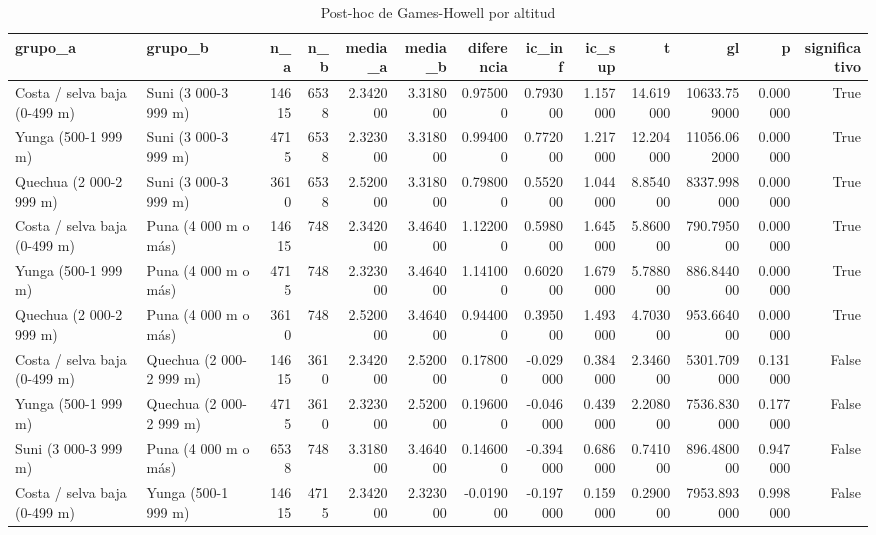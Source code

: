 \begin{table}[htbp]
\caption{Post-hoc de Games-Howell por altitud}
\label{tab:tabla_36_posthoc_altitud}
\begin{tabular}{llrrrrrrrrrrr}
\toprule
grupo\_a & grupo\_b & n\_a & n\_b & media\_a & media\_b & diferencia & ic\_inf & ic\_sup & t & gl & p & significativo \\
\midrule
Costa / selva baja (0-499 m) & Suni (3 000-3 999 m) & 14615 & 6538 & 2.342000 & 3.318000 & 0.975000 & 0.793000 & 1.157000 & 14.619000 & 10633.759000 & 0.000000 & True \\
Yunga (500-1 999 m) & Suni (3 000-3 999 m) & 4715 & 6538 & 2.323000 & 3.318000 & 0.994000 & 0.772000 & 1.217000 & 12.204000 & 11056.062000 & 0.000000 & True \\
Quechua (2 000-2 999 m) & Suni (3 000-3 999 m) & 3610 & 6538 & 2.520000 & 3.318000 & 0.798000 & 0.552000 & 1.044000 & 8.854000 & 8337.998000 & 0.000000 & True \\
Costa / selva baja (0-499 m) & Puna (4 000 m o más) & 14615 & 748 & 2.342000 & 3.464000 & 1.122000 & 0.598000 & 1.645000 & 5.860000 & 790.795000 & 0.000000 & True \\
Yunga (500-1 999 m) & Puna (4 000 m o más) & 4715 & 748 & 2.323000 & 3.464000 & 1.141000 & 0.602000 & 1.679000 & 5.788000 & 886.844000 & 0.000000 & True \\
Quechua (2 000-2 999 m) & Puna (4 000 m o más) & 3610 & 748 & 2.520000 & 3.464000 & 0.944000 & 0.395000 & 1.493000 & 4.703000 & 953.664000 & 0.000000 & True \\
Costa / selva baja (0-499 m) & Quechua (2 000-2 999 m) & 14615 & 3610 & 2.342000 & 2.520000 & 0.178000 & -0.029000 & 0.384000 & 2.346000 & 5301.709000 & 0.131000 & False \\
Yunga (500-1 999 m) & Quechua (2 000-2 999 m) & 4715 & 3610 & 2.323000 & 2.520000 & 0.196000 & -0.046000 & 0.439000 & 2.208000 & 7536.830000 & 0.177000 & False \\
Suni (3 000-3 999 m) & Puna (4 000 m o más) & 6538 & 748 & 3.318000 & 3.464000 & 0.146000 & -0.394000 & 0.686000 & 0.741000 & 896.480000 & 0.947000 & False \\
Costa / selva baja (0-499 m) & Yunga (500-1 999 m) & 14615 & 4715 & 2.342000 & 2.323000 & -0.019000 & -0.197000 & 0.159000 & 0.290000 & 7953.893000 & 0.998000 & False \\
\bottomrule
\end{tabular}
\end{table}
